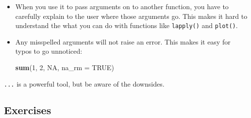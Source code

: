 \documentclass[]{book}
\newenvironment{Shaded}{\begin{snugshade}}{\end{snugshade}}
\newcommand{\DataTypeTok}[1]{\textcolor[rgb]{0.13,0.29,0.53}{#1}}
\newcommand{\DecValTok}[1]{\textcolor[rgb]{0.00,0.00,0.81}{#1}}
\newcommand{\KeywordTok}[1]{\textcolor[rgb]{0.13,0.29,0.53}{\textbf{#1}}}
\newcommand{\NormalTok}[1]{#1}
\newcommand{\OtherTok}[1]{\textcolor[rgb]{0.56,0.35,0.01}{#1}}
\theoremstyle{definition}
\theoremstyle{definition}
\theoremstyle{definition}
\theoremstyle{remark}
\begin{document}
\begin{itemize}
\item
  When you use it to pass arguments on to another function, you have to
  carefully explain to the user where those arguments go. This makes it
  hard to understand the what you can do with functions like
  \texttt{lapply()} and \texttt{plot()}.
\item
  Any misspelled arguments will not raise an error. This makes it easy
  for typos to go unnoticed:

\begin{Shaded}
\begin{Highlighting}[]
\KeywordTok{sum}\NormalTok{(}\DecValTok{1}\NormalTok{, }\DecValTok{2}\NormalTok{, }\OtherTok{NA}\NormalTok{, }\DataTypeTok{na_rm =} \OtherTok{TRUE}\NormalTok{)}
\end{Highlighting}
\end{Shaded}
\end{itemize}

\texttt{...} is a powerful tool, but be aware of the downsides.

\hypertarget{exercises-3}{%
\subsection{Exercises}\label{exercises-3}}
\end{document}
